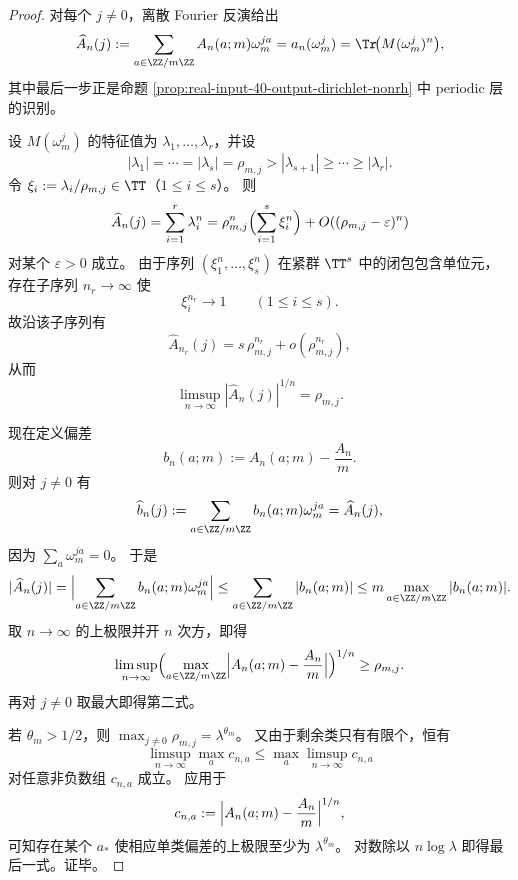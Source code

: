 \begin{proof}
对每个 \(j\neq 0\)，离散 Fourier 反演给出
\[
\widehat A_n(j)
:=
\sum_{a\in\ZZ/m\ZZ}A_n(a;m)\omega_m^{ja}
=
a_n(\omega_m^j)
=
\Tr\!\bigl(M(\omega_m^j)^n\bigr),
\]
其中最后一步正是命题 \ref{prop:real-input-40-output-dirichlet-nonrh} 中 periodic 层的识别。

设 \(M(\omega_m^j)\) 的特征值为 \(\lambda_1,\dots,\lambda_r\)，并设
\[
|\lambda_1|=\cdots=|\lambda_s|=\rho_{m,j}>|\lambda_{s+1}|\ge \cdots \ge |\lambda_r|.
\]
令 \(\xi_i:=\lambda_i/\rho_{m,j}\in\TT\)（\(1\le i\le s\)）。
则
\[
\widehat A_n(j)
=
\sum_{i=1}^{r}\lambda_i^n
=
\rho_{m,j}^n\Bigl(\sum_{i=1}^{s}\xi_i^n\Bigr)+O((\rho_{m,j}-\varepsilon)^n)
\]
对某个 \(\varepsilon>0\) 成立。
由于序列 \((\xi_1^n,\dots,\xi_s^n)\) 在紧群 \(\TT^s\) 中的闭包包含单位元，存在子序列 \(n_r\to\infty\) 使
\[
\xi_i^{n_r}\to 1
\qquad(1\le i\le s).
\]
故沿该子序列有
\[
\widehat A_{n_r}(j)=s\,\rho_{m,j}^{n_r}+o(\rho_{m,j}^{n_r}),
\]
从而
\[
\limsup_{n\to\infty}|\widehat A_n(j)|^{1/n}=\rho_{m,j}.
\]

现在定义偏差
\[
b_n(a;m):=A_n(a;m)-\frac{A_n}{m}.
\]
则对 \(j\neq 0\) 有
\[
\widehat b_n(j)
:=
\sum_{a\in\ZZ/m\ZZ}b_n(a;m)\omega_m^{ja}
=
\widehat A_n(j),
\]
因为 \(\sum_a \omega_m^{ja}=0\)。
于是
\[
|\widehat A_n(j)|
=
\Bigl|\sum_{a\in\ZZ/m\ZZ}b_n(a;m)\omega_m^{ja}\Bigr|
\le
\sum_{a\in\ZZ/m\ZZ}|b_n(a;m)|
\le
m\max_{a\in\ZZ/m\ZZ}|b_n(a;m)|.
\]
取 \(n\to\infty\) 的上极限并开 \(n\) 次方，即得
\[
\limsup_{n\to\infty}
\Bigl(
\max_{a\in\ZZ/m\ZZ}\Bigl|A_n(a;m)-\frac{A_n}{m}\Bigr|
\Bigr)^{1/n}
\ge
\rho_{m,j}.
\]
再对 \(j\neq 0\) 取最大即得第二式。

若 \(\theta_m>1/2\)，则 \(\max_{j\neq 0}\rho_{m,j}=\lambda^{\theta_m}\)。
又由于剩余类只有有限个，恒有
\[
\limsup_{n\to\infty}\max_{a} c_{n,a}\le \max_{a}\limsup_{n\to\infty} c_{n,a}
\]
对任意非负数组 \(c_{n,a}\) 成立。
应用于
\[
c_{n,a}:=\Bigl|A_n(a;m)-\frac{A_n}{m}\Bigr|^{1/n},
\]
可知存在某个 \(a_\ast\) 使相应单类偏差的上极限至少为 \(\lambda^{\theta_m}\)。
对数除以 \(n\log\lambda\) 即得最后一式。证毕。
\end{proof}

\endinput
